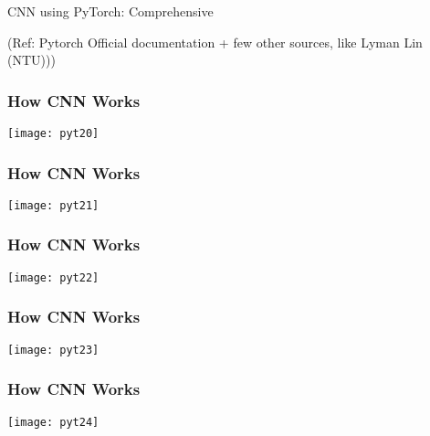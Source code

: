 \begin{frame}
  \begin{center}
    {\Large CNN using PyTorch: Comprehensive}
    
\tiny{(Ref: Pytorch Official documentation + few other sources, like Lyman Lin (NTU)))}
  \end{center}
\end{frame}



\begin{frame}[fragile] \frametitle{How CNN Works}
\begin{center}
\texttt{[image: pyt20]}
\end{center}

\end{frame}

\begin{frame}[fragile] \frametitle{How CNN Works}
\begin{center}
\texttt{[image: pyt21]}
\end{center}

\end{frame}

\begin{frame}[fragile] \frametitle{How CNN Works}
\begin{center}
\texttt{[image: pyt22]}
\end{center}

\end{frame}

\begin{frame}[fragile] \frametitle{How CNN Works}
\begin{center}
\texttt{[image: pyt23]}
\end{center}

\end{frame}

\begin{frame}[fragile] \frametitle{How CNN Works}
\begin{center}
\texttt{[image: pyt24]}
\end{center}

\end{frame}


